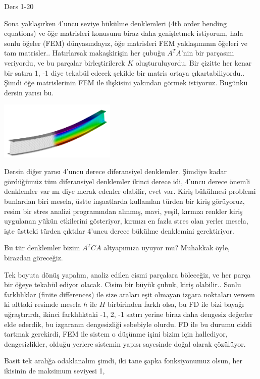 \documentclass[12pt,fleqn]{article}\usepackage{../../common}
\begin{document}
Ders 1-20

Sona yaklaşırken 4'uncu seviye bükülme denklemleri (4th order bending equations)
ve öğe matrisleri konusunu biraz daha genişletmek istiyorum, hala sonlu öğeler
(FEM) dünyasındayız, öğe matrisleri FEM yaklaşımının öğeleri ve tam
matrisler.. Hatırlarsak makaşkirişin her çubuğu $A^T A$'nin bir parçasını
veriyordu, ve bu parçalar birleştirilerek $K$ oluşturuluyordu. Bir çizitte her
kenar bir satıra 1, -1 diye tekabül edecek şekilde bir matris ortaya
çıkartabiliyordu.. Şimdi öğe matrislerinin FEM ile ilişkisini yakından görmek
istiyoruz. Bugünkü dersin yarısı bu.

\includegraphics[width=15em]{compscieng_1_20_01.png}

Dersin diğer yarısı 4'uncu derece diferansiyel denklemler. Şimdiye kadar
gördüğümüz tüm diferansiyel denklemler ikinci derece idi, 4'uncu derece önemli
denklemler var mı diye merak edenler olabilir, evet var. Kiriş bükülmesi
problemi bunlardan biri mesela, üstte inşaatlarda kullanılan türden bir kiriş
görüyoruz, resim bir stres analizi programından alınmış, mavi, yeşil, kırmızı
renkler kiriş uygulanan yükün etkilerini gösteriyor, kırmızı en fazla stres olan
yerler mesela, işte üstteki türden çıktılar 4'uncu derece bükülme denklemini
gerektiriyor.

Bu tür denklemler bizim $A^T C A$ altyapımıza uyuyor mu? Muhakkak öyle,
birazdan göreceğiz. 

Tek boyuta dönüş yapalım, analiz edilen cismi parçalara böleceğiz, ve her parça
bir öğeye tekabül ediyor olacak. Cisim bir büyük çubuk, kiriş olabilir..  Sonlu
farklılıklar (finite differences) ile size araları eşit olmayan izgara noktaları
versem ki alttaki resimde mesela $h$ ile $H$ birbirinden farklı olsa, bu FD ile
bizi bayağı uğraştırırdı, ikinci farklılıktaki -1, 2, -1 satırı yerine biraz
daha dengesiz değerler elde ederdik, bu izgaranın dengesizliği sebebiyle
olurdu. FD ile bu durumu ciddi tartmak gerekirdi, FEM ile sistem o düşünme işini
bizim için hallediyor, dengesizlikler, olduğu yerlere sistemin yapısı
sayesinde doğal olarak çözülüyor. 

Basit tek aralığa odaklanalım şimdi, iki tane şapka fonksiyonumuz olsun, her
ikisinin de maksimum seviyesi 1,
\end{document}
